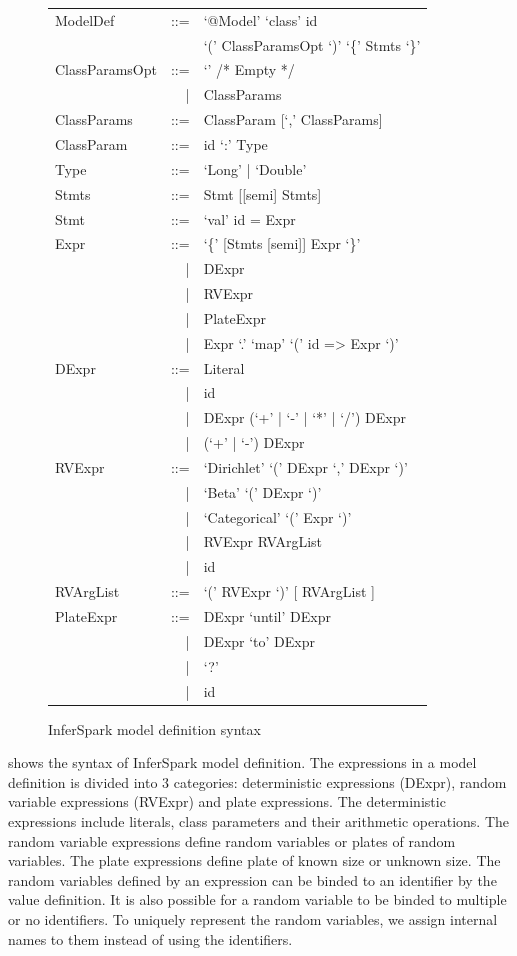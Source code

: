 \begin{figure}[!h]
\centering
\small
	\begin{tabular}{lrl}
		ModelDef		& ::= & `@Model' `class' id \\
					&     &`(' ClassParamsOpt `)' `\{' Stmts `\}' \\
		ClassParamsOpt	& ::= & `' /* Empty */ \\
						&	| &	ClassParams \\
		ClassParams		& ::= & ClassParam  [`,' ClassParams] \\
		ClassParam		& ::= & id `:' Type \\
		Type			& ::= & `Long' | `Double' \\
		Stmts			& ::= & Stmt [[semi] Stmts]\\
		Stmt			& ::= & `val' id = Expr \\
		Expr			& ::= & `\{' [Stmts [semi]] Expr `\}' \\
						&	| & DExpr	\\
						&   | & RVExpr \\
						&	| & PlateExpr \\
						&	| & Expr `.' `map' `(' id => Expr `)'\\
		DExpr			& ::= & Literal	\\
						&   | & id \\
						&   | & DExpr (`+' | `-' | `*' | `/') DExpr \\
						&   | & (`+' | `-') DExpr	\\
		RVExpr			& ::= & `Dirichlet' `(' DExpr `,' DExpr `)' \\
						&   | & `Beta' `(' DExpr `)' \\
						&   | & `Categorical' `(' Expr `)' \\
						&   | & RVExpr RVArgList	\\
						&   | & id	\\
		RVArgList		& ::= & `(' RVExpr `)' [ RVArgList ] \\
		PlateExpr		& ::= & DExpr `until' DExpr	\\ 
						&   | & DExpr `to' DExpr	\\
						&	| & `?' \\
						&	| & id
	\end{tabular}
\caption{InferSpark model definition syntax}
\label{fig:inferspark_syntax}
\end{figure}

 shows the syntax of InferSpark model
definition. The expressions in a model definition is divided into 3
categories: deterministic expressions (DExpr), random variable expressions
(RVExpr) and plate expressions. The deterministic expressions include
literals, class parameters and their arithmetic operations. The random
variable expressions define random variables or plates of random variables.
The plate expressions define plate of known size or unknown size. The random
variables defined by an expression can be binded to an identifier by the value
definition. It is also possible for a random variable to be binded to multiple
or no identifiers. To uniquely represent the random variables, we assign
internal names to them instead of using the identifiers.

